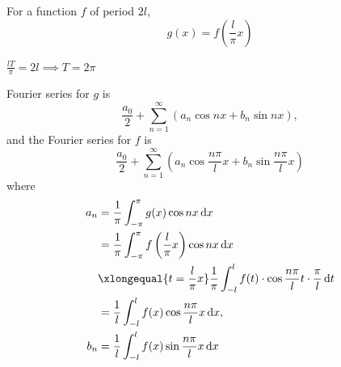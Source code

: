 \begin{remark}
    For a function $f$ of period $2l$,
    $$g(x)=f\left(\frac{l}{\pi}x\right)$$

    $\frac{lT}{\pi}=2l\implies T=2\pi$

    Fourier series for $g$ is
    $$\frac{a_0}{2}+\sum_{n=1}^{\infty}\left(a_n\cos nx+b_n\sin nx\right),$$
    and the Fourier series for $f$ is
    $$\frac{a_0}{2}+\sum_{n=1}^{\infty}\left(a_n\cos\frac{n\pi}{l}x+b_n\sin\frac{n\pi}{l}x\right)$$
    where
    \begin{align*}
        a_n & =\frac{1}{\pi}\int_{-\pi}^{\pi}g(x)\cos nx\,\mathrm{d}x                                                           \\
            & =\frac{1}{\pi}\int_{-\pi}^{\pi}f\left(\frac{l}{\pi}x\right)\cos nx\,\mathrm{d}x                                   \\
            & \xlongequal{t=\frac{l}{\pi}x}\frac{1}{\pi}\int_{-l}^l f(t)\cdot\cos\frac{n\pi}{l}t\cdot\frac{\pi}{l}\,\mathrm{d}t \\
            & =\frac{1}{l}\int_{-l}^l f(x)\cos\frac{n\pi}{l}x\,\mathrm{d}x,                                                     \\
        b_n & =\frac{1}{l}\int_{-l}^l f(x)\sin\frac{n\pi}{l}x\,\mathrm{d}x
    \end{align*}
\end{remark}

